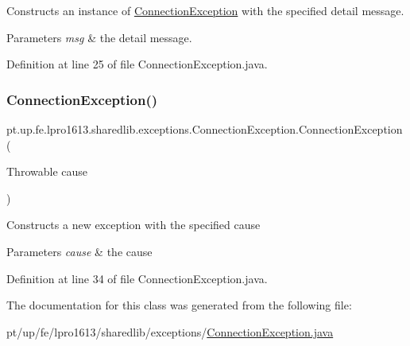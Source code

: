Constructs an instance of {\ttfamily \hyperlink{classpt_1_1up_1_1fe_1_1lpro1613_1_1sharedlib_1_1exceptions_1_1_connection_exception}{Connection\+Exception}} with the specified detail message.


\begin{DoxyParams}{Parameters}
{\em msg} & the detail message. \\
\hline
\end{DoxyParams}


Definition at line 25 of file Connection\+Exception.\+java.

\hypertarget{classpt_1_1up_1_1fe_1_1lpro1613_1_1sharedlib_1_1exceptions_1_1_connection_exception_a78daf9e69ac5d62dfc64bca6da1115a7}{}\label{classpt_1_1up_1_1fe_1_1lpro1613_1_1sharedlib_1_1exceptions_1_1_connection_exception_a78daf9e69ac5d62dfc64bca6da1115a7} 
\subsubsection{\texorpdfstring{Connection\+Exception()}{ConnectionException()}\hspace{0.1cm}{\footnotesize\ttfamily [3/3]}}
{\footnotesize\ttfamily pt.\+up.\+fe.\+lpro1613.\+sharedlib.\+exceptions.\+Connection\+Exception.\+Connection\+Exception (\begin{DoxyParamCaption}\item[{Throwable}]{cause }\end{DoxyParamCaption})}

Constructs a new exception with the specified cause


\begin{DoxyParams}{Parameters}
{\em cause} & the cause \\
\hline
\end{DoxyParams}


Definition at line 34 of file Connection\+Exception.\+java.



The documentation for this class was generated from the following file\+:\begin{DoxyCompactItemize}
\item 
pt/up/fe/lpro1613/sharedlib/exceptions/\hyperlink{_connection_exception_8java}{Connection\+Exception.\+java}\end{DoxyCompactItemize}
